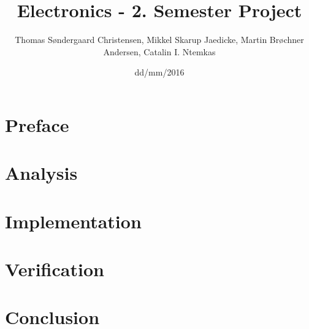 \documentclass[a4paper,10pt]{article}
\title{Electronics - 2. Semester Project}
\author{Thomas Søndergaard Christensen, Mikkel 
Skarup Jaedicke, Martin Brøchner Andersen, Catalin I. Ntemkas‎}
\date{dd/mm/2016}
\begin{document}

\newpage
{}

\newpage
\tableofcontents
\newpage
\listoftodos
\listoffigures
\listoftables
\clearpage
\newpage
{}
\part{Preface}

\newpage

\newpage
\part{Analysis}

\newpage

\newpage
\part{Implementation}

\newpage
\part{Verification}
\label{part:verification}

\newpage
\part{Conclusion}



\appendix

\newpage

\newpage

\newpage

\end{document}
